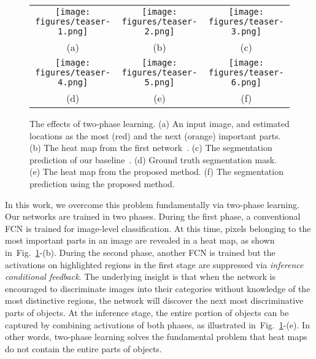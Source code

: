 \documentclass[10pt,twocolumn,letterpaper]{article}
\newcommand{\figref}[1]{Fig.~\ref{#1}}
\begin{document}
\begin{figure}[t]
\def\arraystretch{0.5}
\begin{tabular}{@{}c@{\hskip 0.01\linewidth}c@{\hskip 0.01\linewidth}c@{\hskip 0.01\linewidth}}

\texttt{[image: figures/teaser-1.png]} &
\texttt{[image: figures/teaser-2.png]} &
\texttt{[image: figures/teaser-3.png]}\\{\small (a)} & {\small (b) } & {\small (c) }\\
\texttt{[image: figures/teaser-4.png]} &
\texttt{[image: figures/teaser-5.png]} &
\texttt{[image: figures/teaser-6.png]} \\
{\small (d)} & {\small (e)} & {\small (f)}
\end{tabular}
\caption{The effects of two-phase learning. (a) An input image, and estimated locations as the most (red) and the next (orange) important parts. (b) The heat map from the first network~\cite{zhou2016cvpr}. (c) The segmentation prediction of our baseline~\cite{kolesnikov2016seed}. (d) Ground truth segmentation mask. (e) The heat map from the proposed method. (f) The segmentation prediction using the proposed method.}
\label{fig:teaser}
\end{figure}


In this work, we overcome this problem fundamentally via two-phase learning. Our networks are trained in two phases. During the first phase, a conventional FCN is trained for image-level classification. At this time, pixels belonging to the most important parts in an image are revealed in a heat map, as shown in~\figref{fig:teaser}-(b).  During the second phase, another FCN is trained but the activations on highlighted regions in the first stage are suppressed via \textit{inference conditional feedback}. %
The underlying insight is that when the network is encouraged to discriminate images into their categories without knowledge of the most distinctive regions, the network will discover the next most discriminative parts of objects. At the inference stage, the entire portion of objects can be captured by combining activations of both phases, as illustrated in~\figref{fig:teaser}-(e). In other words, two-phase learning solves the fundamental problem that heat maps do not contain the entire parts of objects.
\end{document}

